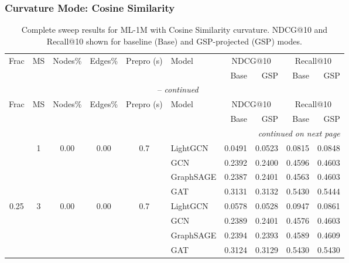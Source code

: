 \subsubsection*{Curvature Mode: Cosine Similarity}
{\footnotesize
\setlength{\tabcolsep}{4pt}
\begin{longtable}{cccccl rrrr}
\caption{Complete sweep results for ML-1M with Cosine Similarity curvature. NDCG@10 and Recall@10 shown for baseline (Base) and GSP-projected (GSP) modes.} \label{tab:ml1m_cosine_sweep} \\
\toprule
\multirow{2}{*}{Frac} & \multirow{2}{*}{MS} & \multirow{2}{*}{Nodes\%} & \multirow{2}{*}{Edges\%} & \multirow{2}{*}{Prepro (s)} & \multirow{2}{*}{Model} & \multicolumn{2}{c}{NDCG@10} & \multicolumn{2}{c}{Recall@10} \\
\cmidrule(lr){7-8}\cmidrule(lr){9-10}
 & & & & & & Base & GSP & Base & GSP \\
\midrule
\endfirsthead
\multicolumn{10}{c}{\tablename~\thetable{} -- \textit{continued}} \\
\toprule
\multirow{2}{*}{Frac} & \multirow{2}{*}{MS} & \multirow{2}{*}{Nodes\%} & \multirow{2}{*}{Edges\%} & \multirow{2}{*}{Prepro (s)} & \multirow{2}{*}{Model} & \multicolumn{2}{c}{NDCG@10} & \multicolumn{2}{c}{Recall@10} \\
\cmidrule(lr){7-8}\cmidrule(lr){9-10}
 & & & & & & Base & GSP & Base & GSP \\
\midrule
\endhead
\midrule \multicolumn{10}{r}{\textit{continued on next page}} \\
\endfoot
\bottomrule
\endlastfoot
\multirow{4}{*}{0.25} & \multirow{4}{*}{1} & \multirow{4}{*}{0.00} & \multirow{4}{*}{0.00} & \multirow{4}{*}{0.7} & LightGCN & 0.0491 & 0.0523 & 0.0815 & 0.0848 \\
 & & & & & GCN & 0.2392 & 0.2400 & 0.4596 & 0.4603 \\
 & & & & & GraphSAGE & 0.2387 & 0.2401 & 0.4563 & 0.4603 \\
 & & & & & GAT & 0.3131 & 0.3132 & 0.5430 & 0.5444 \\
\midrule
\multirow{4}{*}{0.25} & \multirow{4}{*}{3} & \multirow{4}{*}{0.00} & \multirow{4}{*}{0.00} & \multirow{4}{*}{0.7} & LightGCN & 0.0578 & 0.0528 & 0.0947 & 0.0861 \\
 & & & & & GCN & 0.2389 & 0.2401 & 0.4576 & 0.4603 \\
 & & & & & GraphSAGE & 0.2394 & 0.2393 & 0.4589 & 0.4609 \\
 & & & & & GAT & 0.3124 & 0.3129 & 0.5430 & 0.5430 \\

\end{longtable}}
